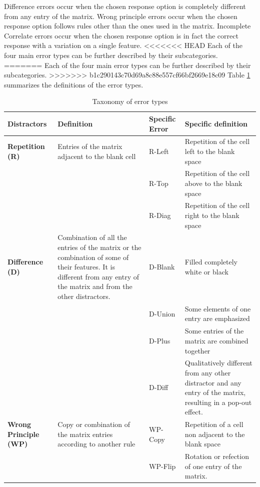 Difference errors occur when the chosen response option is completely different from any entry of the matrix.
Wrong principle errors occur when the chosen response option follows rules other than the ones used in the matrix. Incomplete Correlate errors occur when the chosen response option is in fact the correct response with a variation on a single feature.
<<<<<<< HEAD
Each of the four main error types can be further described by their subcategories.\\
=======
Each of the four main error types can be further described by their subcategories.
>>>>>>> b1c290143c70d69a8c88e557cf66bf2669e18c09
Table \ref{tab:tab-error-types-static} summarizes the definitions of the error types.

\begin{table}

\caption{\label{tab:tab-error-types-static}Taxonomy of error types}
\centering
\begin{tabular}[t]{>{}l|l|l|l}
\hline
Distractors & Definition & Specific Error & Specific definition\\
\hline
\textbf{Repetition (R)} & Entries of the matrix adjacent to the blank cell & R-Left & Repetition of the cell left to the blank space\\
\hline
\textbf{} &  & R-Top & Repetition of the cell above to the blank space\\
\hline
\textbf{} &  & R-Diag & Repetition of the cell right to the blank space\\
\hline
\textbf{Difference (D)} & Combination of all the entries of the matrix or the combination of some of their features. It is different from any entry of the matrix and from the other distractors. & D-Blank & Filled completely white or black\\
\hline
\textbf{} &  & D-Union & Some elements of one entry are emphasized\\
\hline
\textbf{} &  & D-Plus & Some entries of the matrix are combined together\\
\hline
\textbf{} &  & D-Diff & Qualitatively different from any other distractor and any entry of the matrix, resulting in a pop-out effect.\\
\hline
\textbf{Wrong Principle (WP)} & Copy or combination of the matrix entries according to another rule & WP-Copy & Repetition of a cell non adjacent to the blank space\\
\hline
\textbf{} &  & WP-Flip & Rotation or refection of one entry of the matrix.\\
\hline

\end{tabular}
\end{table}
